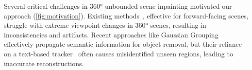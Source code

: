 Several critical challenges in 360° unbounded scene inpainting motivated our approach (\cref{fig:motivation}). Existing methods~\cite{spinnerf, wang2024gscream, mirzaei2023reference, mirzaei2024reffusionreferenceadapteddiffusion}, effective for forward-facing scenes, struggle with extreme viewpoint changes in 360° scenes, resulting in inconsistencies and artifacts. Recent approaches like Gaussian Grouping~\citep{ye2023gaussian} effectively propagate semantic information for object removal, but their reliance on a text-based tracker~\cite{cheng2023tracking} often causes misidentified unseen regions, leading to inaccurate reconstructions.

